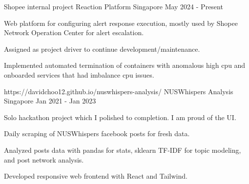 

\begin{cventries}

\cventry
{Shopee internal project} %
{Reaction Platform} %
{Singapore} %
{May 2024 - Present} %
{
  \begin{cvitems} %
    \item {Web platform for configuring alert response execution, mostly used by Shopee Network Operation Center for alert escalation.}
    \item {Assigned as project driver to continue development/maintenance.}
    \item {Implemented automated termination of containers with anomalous high cpu and onboarded services that had imbalance cpu issues.}
  \end{cvitems}
}

  \cventry
    {https://davidchoo12.github.io/nuswhispers-analysis/} %
    {NUSWhispers Analysis} %
    {Singapore} %
    {Jan 2021 - Jan 2023} %
    {
      \begin{cvitems} %
        \item {Solo hackathon project which I polished to completion. I am proud of the UI.}
        \item {Daily scraping of NUSWhispers facebook posts for fresh data.}
        \item {Analyzed posts data with pandas for stats, sklearn TF-IDF for topic modeling, and post network analysis.}
        \item {Developed responsive web frontend with React and Tailwind.}
      \end{cvitems}
    }



\end{cventries}

